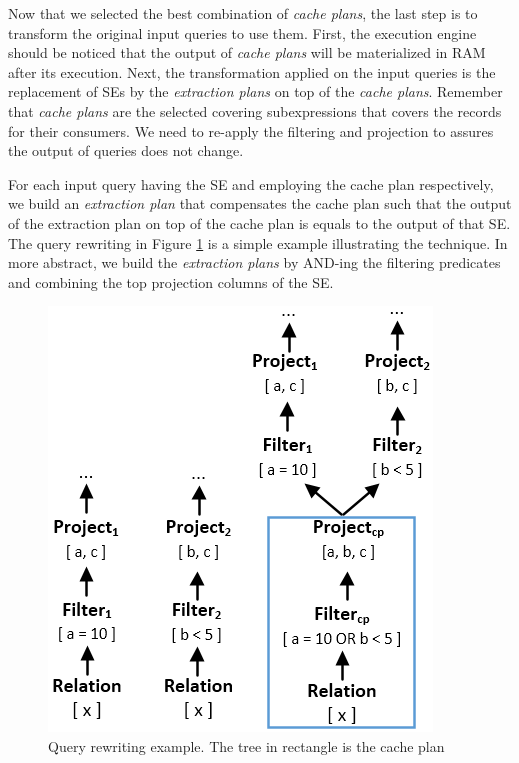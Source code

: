 Now that we selected the best combination of \emph{cache plans}, the last step is to transform the original input queries to use them. First, the execution engine should be noticed that the output of \emph{cache plans} will be materialized in RAM after its execution. Next, the transformation applied on the input queries is the replacement of SEs by the \emph{extraction plans} on top of the \emph{cache plans}. Remember that \emph{cache plans} are the selected covering subexpressions that covers the records for their consumers. We need to re-apply the filtering and projection to assures the output of queries does not change.

For each input query having the SE and employing the cache plan respectively, we build an \emph{extraction plan} that compensates the cache plan such that the output of the extraction plan on top of the cache plan is equals to the output of that SE. The query rewriting in Figure \ref{fig:rewrite} is a simple example illustrating the technique. In more abstract, we build the \emph{extraction plans} by AND-ing the filtering predicates and combining the top projection columns of the SE.

\begin{figure}[!htb]
	\centering
	\includegraphics[scale=0.55]{figures/rewrite}
	\caption{Query rewriting example. The tree in rectangle is the cache plan}
   	\label{fig:rewrite}
\end{figure}